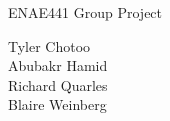\documentclass[../main.tex]{subfiles}
\begin{document}
\begin{center}
\begin{Huge}
ENAE441 Group Project\\
\vspace{1cm}
\end{Huge}  


{\parindent0pt
\Large

Tyler Chotoo\\
Abubakr Hamid\\
Richard Quarles\\
Blaire Weinberg\\}
\medskip
\end{center}  

\newpage
\end{document}
